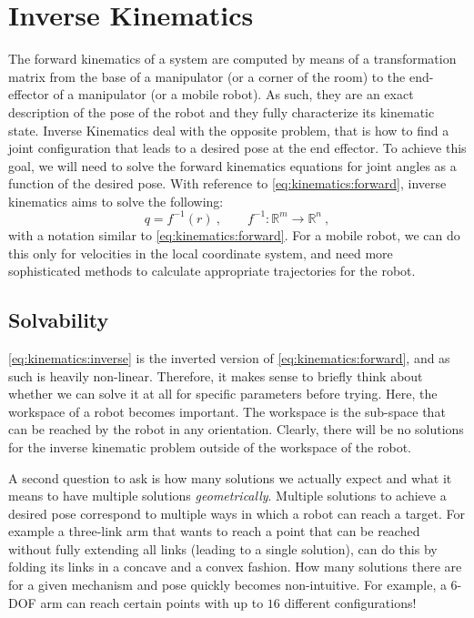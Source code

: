 \section{Inverse Kinematics}\label{sec:kinematics:ik}

The forward kinematics of a system are computed by means of a transformation matrix from the base of a manipulator (or a corner of the room) to the end-effector of a manipulator (or a mobile robot).
As such, they are an exact description of the pose of the robot and they fully characterize its kinematic state.
Inverse Kinematics deal with the opposite problem, that is how to find a joint configuration that leads to a desired pose at the end effector.
To achieve this goal, we will need to solve the forward kinematics equations for joint angles as a function of the desired pose.
With reference to \cref{eq:kinematics:forward}, inverse kinematics aims to solve the following:
\begin{equation}\label{eq:kinematics:inverse}
q = f^{-1} (r)\ , \qquad f^{-1} : \mathbb{R}^m \rightarrow \mathbb{R}^n \ ,
\end{equation}
with a notation similar to \cref{eq:kinematics:forward}.
For a mobile robot, we can do this only for velocities in the local coordinate system, and need more sophisticated methods to calculate appropriate trajectories for the robot.

\subsection{Solvability}

\cref{eq:kinematics:inverse} is the inverted version of \cref{eq:kinematics:forward}, and as such is heavily non-linear.
Therefore, it makes sense to briefly think about whether we can solve it at all for specific parameters before trying.
Here, the workspace of a robot becomes important. The workspace is the sub-space that can be reached by the robot in any orientation.
Clearly, there will be no solutions for the inverse kinematic problem outside of the workspace of the robot.

A second question to ask is how many solutions we actually expect and what it means to have multiple solutions \textsl{geometrically}.
Multiple solutions to achieve a desired pose correspond to multiple ways in which a robot can reach a target.
For example a three-link arm that wants to reach a point that can be reached without fully extending all links (leading to a single solution), can do this by folding its links in a concave and a convex fashion.
How many solutions there are for a given mechanism and pose quickly becomes non-intuitive.
For example, a 6-DOF arm can reach certain points with up to $16$ different configurations!

